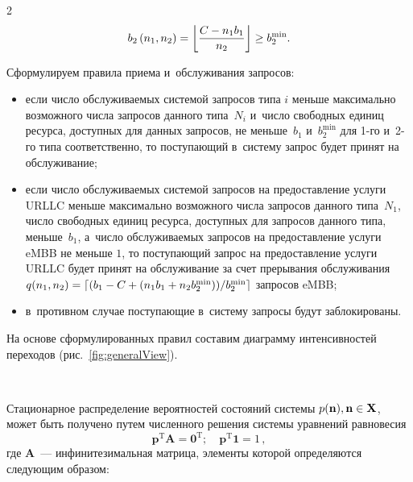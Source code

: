 \begin{multicols}{2}
\noindent
$$
b_2\left(n_1,n_2\right) = \left\lfloor \displaystyle\frac{\displaystyle C-n_1 b_1\mathstrut}{\displaystyle n_2\mathstrut} \right\rfloor \geq b_2^{\min}.
$$

Сформулируем правила приема и~обслуживания запросов:
\begin{itemize}
    \item если число обслуживаемых сис\-те\-мой запросов типа $i$ меньше максимально 
возможного чис\-ла запросов данного типа~$N_i$ и~чис\-ло свободных единиц ресурса, 
доступных для данных запросов, не меньше~$b_1$ и~$b_2^{\min}$ для 1-го и~2-го 
типа соответственно, то поступающий в~сис\-те\-му запрос будет принят на 
обслуживание;
    \item если число обслуживаемых сис\-те\-мой запросов на предостав\-ле\-ние услуги 
URLLC меньше максимально возможного чис\-ла запросов данного типа~$N_1$, чис\-ло 
свободных единиц ресурса, доступных для запросов данного типа, меньше~$b_1$, 
а~чис\-ло обслуживаемых запросов на предостав\-ле\-ние услуги eMBB не меньше $1$, то 
по\-сту\-па\-ющий запрос на предостав\-ле\-ние услуги URLLC будет принят на обслуживание 
за счет прерывания обслуживания $q(n_1,n_2) \hm= \lceil (b_1\hm - C \hm+ (n_1 b_1\hm + n_2 
b_2^{\min}))/b_2^{\min} \rceil$ запросов eMBB;
    \item в~противном случае поступающие в~сис\-те\-му запросы будут заблокированы.
\end{itemize}

На основе сформулированных правил со\-ста\-вим диаграмму интенсивностей переходов 
(рис.~\ref{fig:generalView}).

\begin{figure*} %
\vspace*{1pt}
\begin{center}
   \mbox{%
\epsfxsize=88.713mm 
}
\end{center}
\vspace*{-10pt}
  \label{fig:generalView}
  \vspace*{-5pt}
\end{figure*}

Стационарное распределение вероятностей со\-сто\-яний сис\-те\-мы $p(\mathbf{n}), 
\mathbf{n}\hm \in \mathbf{X}$, может быть получено путем чис\-лен\-но\-го решения сис\-те\-мы 
уравнений равновесия 
$$
\mathbf{p}^{\mathrm{T}} \mathbf{A} = \mathbf{0}^{\mathrm{T}};\quad 
\mathbf{p}^{\mathrm{T}} \mathbf{1} = 1\,,
$$
 где $\mathbf{A}$~--- инфинитезимальная 
мат\-ри\-ца, элементы которой определяются сле\-ду\-ющим образом:


\end{multicols}
